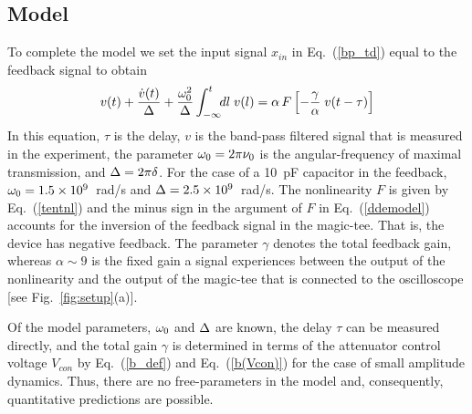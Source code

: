 \documentclass[aps,twocolumn,pre,nofootinbib]{revtex4}
\begin{document}
\subsection{Model}
 To complete the model we set the input signal $x_{in}$ in Eq.~(\ref{bp_td}) equal to the feedback signal to obtain
%
\begin{equation}
\label{ddemodel}
v(t) + \frac{\dot{v}(t)}{\Delta}  + \frac{\omega_0^2}{\Delta} \int_{-\infty}^{t}\!\! dl \; v(l) = \alpha \, F\left[- \frac{\gamma}{\alpha} \; v(t-\tau)\right]
\end{equation}
%
In this equation, $\tau$ is the delay,  $v$ is the band-pass filtered signal that is measured in the experiment, 
 the parameter $\omega_0 = 2 \pi \nu_0$ is the angular-frequency of maximal transmission, and $\Delta = 2 \pi \delta$.  
For the case of a 10~pF capacitor in the feedback,  $\omega_0 = 1.5 \times 10^9$~rad/s and $\Delta = 2.5 \times 10^9$~rad/s. 
The nonlinearity $F$ is given by Eq.~(\ref{tentnl}) and the minus sign in the argument of $F$ in Eq.~(\ref{ddemodel}) accounts for the inversion of the feedback signal in the magic-tee. That is, the device has negative feedback.
The parameter $\gamma$ denotes the total feedback gain,  whereas $\alpha \sim 9$ is the fixed gain a signal experiences between the output of the nonlinearity and the output of the magic-tee that is connected to the oscilloscope [see Fig.~\ref{fig:setup}(a)]. 

Of the model parameters, $\omega_0$ and $\Delta$ are known, the delay $\tau$ can be measured directly, and the total gain $\gamma$ is determined in terms of the attenuator control voltage $V_{con}$ by Eq.~(\ref{b_def}) and Eq.~(\ref{b(Vcon)}) for the case of small amplitude dynamics. Thus, there are no free-parameters in the model and, consequently, quantitative predictions are possible.
\end{document}

